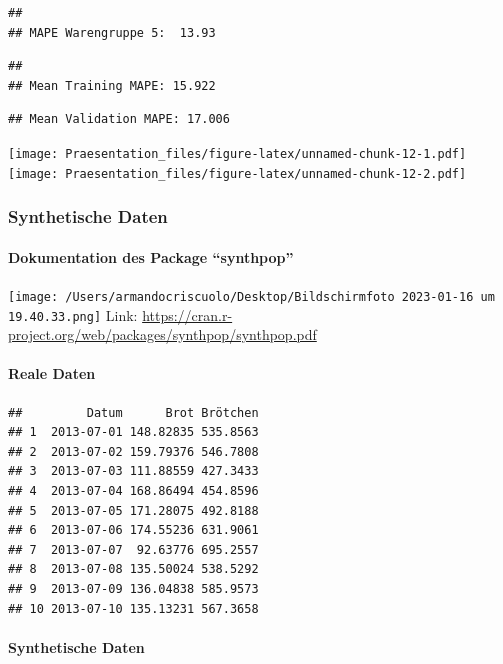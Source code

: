 \documentclass[
]{article}
\begin{document}
\begin{verbatim}
## 
## MAPE Warengruppe 5:  13.93
\end{verbatim}

\begin{verbatim}
## 
## Mean Training MAPE: 15.922
\end{verbatim}

\begin{verbatim}
## Mean Validation MAPE: 17.006
\end{verbatim}

\texttt{[image: Praesentation\_files/figure-latex/unnamed-chunk-12-1.pdf]}
\texttt{[image: Praesentation\_files/figure-latex/unnamed-chunk-12-2.pdf]}

\hypertarget{synthetische-daten}{%
\subsubsection{Synthetische Daten}\label{synthetische-daten}}

\hypertarget{dokumentation-des-package-synthpop}{%
\paragraph{Dokumentation des Package
``synthpop''}\label{dokumentation-des-package-synthpop}}

\texttt{[image: /Users/armandocriscuolo/Desktop/Bildschirm­foto 2023-01-16 um 19.40.33.png]}
Link:
\url{https://cran.r-project.org/web/packages/synthpop/synthpop.pdf}

\hypertarget{reale-daten}{%
\paragraph{Reale Daten}\label{reale-daten}}

\begin{verbatim}
##         Datum      Brot Brötchen
## 1  2013-07-01 148.82835 535.8563
## 2  2013-07-02 159.79376 546.7808
## 3  2013-07-03 111.88559 427.3433
## 4  2013-07-04 168.86494 454.8596
## 5  2013-07-05 171.28075 492.8188
## 6  2013-07-06 174.55236 631.9061
## 7  2013-07-07  92.63776 695.2557
## 8  2013-07-08 135.50024 538.5292
## 9  2013-07-09 136.04838 585.9573
## 10 2013-07-10 135.13231 567.3658
\end{verbatim}

\hypertarget{synthetische-daten-1}{%
\paragraph{Synthetische Daten}\label{synthetische-daten-1}}
\end{document}
